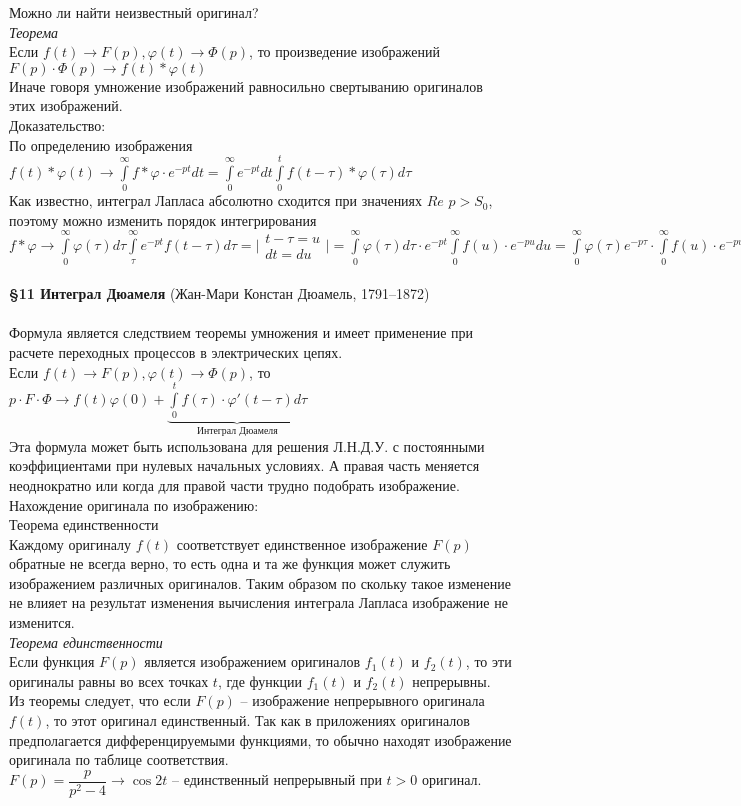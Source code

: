 \documentclass{article}
\numberwithin{equation}{section}
\begin{document}
Можно ли найти неизвестный оригинал?\\
\textit{Теорема}\\
Если $f(t)\rightarrow F(p),\varphi(t)\rightarrow\varPhi(p)$, то произведение изображений $F(p)\cdot\varPhi(p)\rightarrow f(t)*\varphi(t)$\\
Иначе говоря умножение изображений равносильно свертыванию оригиналов этих изображений.\\
Доказательство:\\
По определению изображения $f(t)*\varphi(t)\rightarrow\int\limits_0^\infty f*\varphi\cdot e^{-pt}dt=\int\limits_0^\infty e^{-pt}dt\int\limits_0^t f(t-\tau)*\varphi(\tau)d\tau$\\
Как известно, интеграл Лапласа абсолютно сходится при значениях $Re$ $p>S_0$, поэтому можно изменить порядок интегрирования $f*\varphi\rightarrow\int\limits_0^\infty\varphi(\tau)d\tau\int\limits_\tau^\infty e^{-pt}f(t-\tau)d\tau=\bigg|\begin{matrix}
t-\tau=u\\
dt=du
\end{matrix}\bigg|=\int\limits_0^\infty\varphi(\tau)d\tau\cdot e^{-pt}\int\limits_0^\infty f(u)\cdot e^{-pu}du=\int\limits_0^\infty\varphi(\tau)e^{-p\tau}\cdot\int\limits_0^\infty f(u)\cdot e^{-pu}du=\varPhi(p)\cdot F(p)$
\\\\
\textbf{\large{\S11 Интеграл Дюамеля}} (Жан-Мари Констан Дюамель, 1791--1872)
\\\\
Формула является следствием теоремы умножения и имеет применение при расчете переходных процессов в электрических цепях.\\
Если $f(t)\rightarrow F(p),\varphi(t)\rightarrow\varPhi(p)$, то $p\cdot F\cdot\varPhi\rightarrow f(t)\varphi(0)+\underbrace{\int\limits_0^tf(\tau)\cdot\varphi'(t-\tau)d\tau}_{\mbox{Интеграл Дюамеля}}$\\
Эта формула может быть использована для решения Л.Н.Д.У. с постоянными коэффициентами при нулевых начальных условиях. А правая часть меняется неоднократно или когда для правой части трудно подобрать изображение.\\
Нахождение оригинала по изображению:\\
Теорема единственности\\
Каждому оригиналу $f(t)$ соответствует единственное изображение $F(p)$ обратные не всегда верно, то есть одна и та же функция может служить изображением различных оригиналов. Таким образом по скольку такое изменение не влияет на результат изменения вычисления интеграла Лапласа изображение не изменится.\\
\textit{Теорема единственности}\\
Если функция $F(p)$ является изображением оригиналов $f_1(t)$ и $f_2(t)$, то эти оригиналы равны во всех точках $t$, где функции $f_1(t)$ и $f_2(t)$ непрерывны.\\
Из теоремы следует, что если $F(p)$ -- изображение непрерывного оригинала $f(t)$, то этот оригинал единственный. Так как в приложениях оригиналов предполагается дифференцируемыми функциями, то обычно находят изображение оригинала по таблице соответствия.\\
$F(p)=\dfrac{p}{p^2-4}\rightarrow\cos2t$ -- единственный непрерывный при $t>0$ оригинал.
\end{document}
